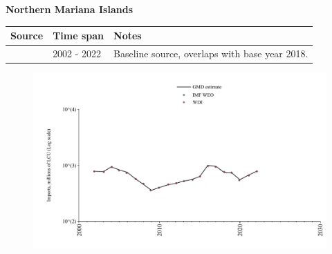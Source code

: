 \documentclass[12pt,a4paper,landscape]{article}
\begin{document}
\begin{adjustbox}{max totalsize={\paperwidth}{\paperheight},center}
\begin{minipage}[t][\textheight][t]{\textwidth}
\vspace*{0.5cm}
{}
\begin{center}
{\Large\bfseries Northern Mariana Islands}
\end{center}
\vspace{0.5cm}
\begin{table}[H]
\centering
\small
\begin{tabular}{|l|l|l|}
\hline
\textbf{Source} & \textbf{Time span} & \textbf{Notes} \\
\hline
\rowcolor{white}\cite{WDI}& 2002 - 2022 &Baseline source, overlaps with base year 2018.\\
\hline
\end{tabular}
\end{table}
\begin{figure}[H]
\centering
\includegraphics[width=\textwidth,height=0.6\textheight,keepaspectratio]{graphs/MNP_imports.pdf}
\end{figure}
\end{minipage}
\end{adjustbox}
\end{document}
